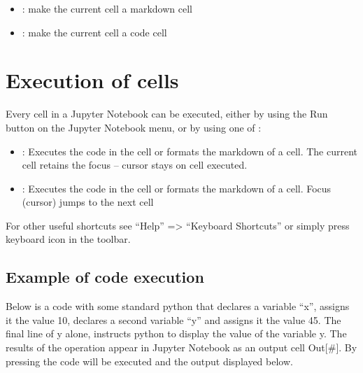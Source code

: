 \documentclass[letterpaper,10pt,english]{jupyterBook}
\begin{document}
\sphinxAtStartPar
{}
\begin{itemize}
\item {} 
\sphinxAtStartPar
{}: make the current cell a markdown cell

\item {} 
\sphinxAtStartPar
{}: make the current cell a code  cell

\end{itemize}


\section{Execution of cells}
\label{\detokenize{content/04_PythonEssentials/Intro_Jupyter_notebook:execution-of-cells}}
\sphinxAtStartPar
Every cell in a Jupyter Notebook can be executed, either by using the Run button on the Jupyter Notebook menu, or by using one of :
\begin{itemize}
\item {} 
\sphinxAtStartPar
{}: Executes the code in the cell or formats the markdown of a cell.  The current cell retains the focus – cursor stays on cell executed.

\item {} 
\sphinxAtStartPar
{}: Executes the code in the cell or formats the markdown of a cell. Focus (cursor) jumps to the next cell

\end{itemize}

\sphinxAtStartPar
For other useful shortcuts see “Help” => “Keyboard Shortcuts” or simply press keyboard icon in the toolbar.


\subsection{Example of code execution}
\label{\detokenize{content/04_PythonEssentials/Intro_Jupyter_notebook:example-of-code-execution}}
\sphinxAtStartPar
Below is a code with some standard python that declares a variable “x”, assigns it the value 10, declares a second variable “y” and assigns it the value 45.  The final line of y alone, instructs python to display the value of the variable y.  The results of the operation appear in Jupyter Notebook as an output cell Out{[}\#{]}.  By pressing  the code will be executed and the output displayed below.
\end{document}
